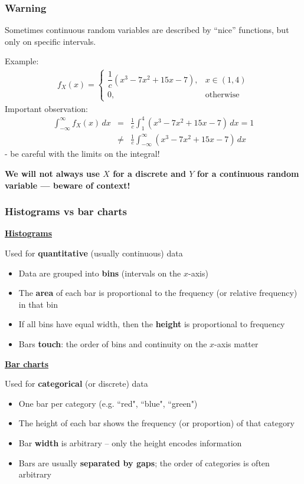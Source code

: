 \documentclass[t,8pt]{beamer}
\begin{document}
	\begin{frame}
		\frametitle{Warning}
		\color{gray}
		Sometimes continuous random variables are described by ``nice'' functions, but only on specific intervals. \par
		Example:
		\begin{eqnarray*}
			f_X(x) = \left\{\begin{array}{ll}
				\dfrac 1c(x^3-7x^2+15x-7), & x\in(1,4)\\[3pt]
				0, & \text{otherwise}
			\end{array}\right.
		\end{eqnarray*}
		\color{black}
		Important observation:
		\begin{eqnarray*}
			\int_{-\infty}^{\infty} f_X(x)\,dx
			&=&\frac 1c\int_1^4 (x^3-7x^2+15x-7)\,dx = 1\\
			&\neq&\frac 1c\int_{-\infty}^{\infty} (x^3-7x^2+15x-7)\,dx
		\end{eqnarray*}
		- be careful with the limits on the integral! \par
		{\bf We will not always use $X$ for a discrete and $Y$ for a continuous random variable — beware of context!}
	\end{frame}
	
	\begin{frame}
		\frametitle{Histograms vs bar charts}
		{\bf\underline{Histograms}} \par
		Used for {\bf quantitative} (usually continuous) data
		\begin{itemize}
			\item Data are grouped into {\bf bins} (intervals on the $x$-axis)
			\item The {\bf area} of each bar is proportional to the frequency (or relative frequency) in that bin
			\item If all bins have equal width, then the {\bf height} is proportional to frequency
			\item Bars {\bf touch}: the order of bins and continuity on the $x$-axis matter
		\end{itemize}
		{\bf\underline{Bar charts}} \par
		Used for {\bf categorical} (or discrete) data
		\begin{itemize}
			\item One bar per category (e.g. ``red", ``blue", ``green")
			\item The height of each bar shows the frequency (or proportion) of that category
			\item Bar {\bf width} is arbitrary – only the height encodes information
			\item Bars are usually {\bf separated by gaps}; the order of categories is often arbitrary
		\end{itemize}
	\end{frame}
	
\end{document}
